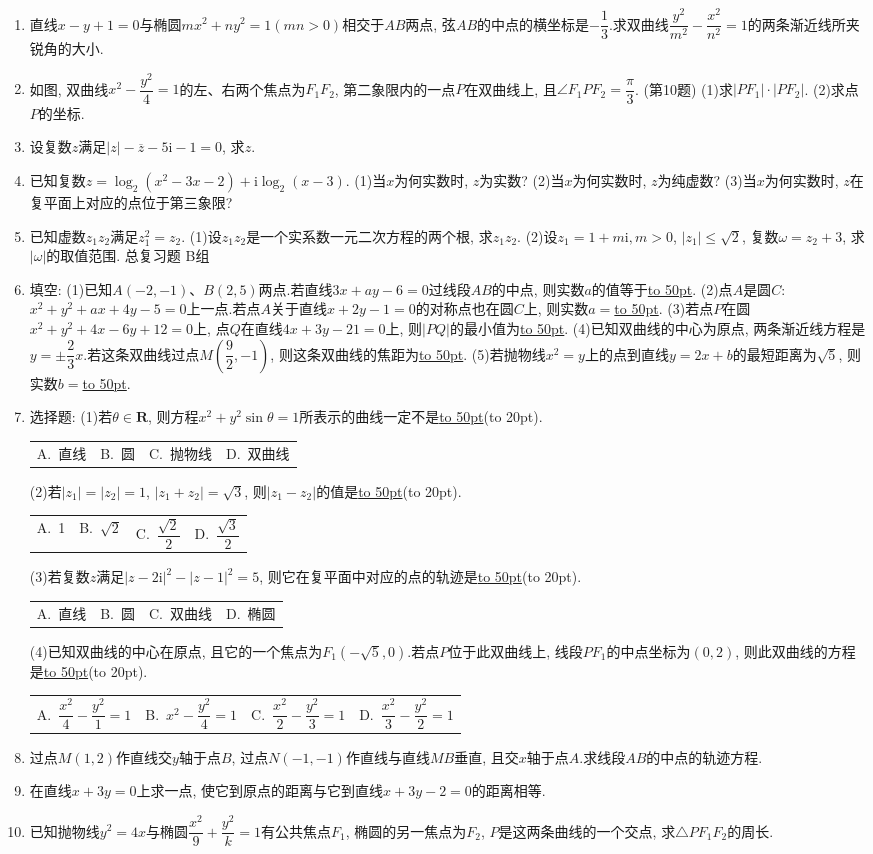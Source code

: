 \documentclass[10pt,a4paper]{article}
\newcommand{\blank}[1]{\underline{\hbox to #1pt{}}}
\newcommand{\bracket}[1]{(\hbox to #1pt{})}
\newcommand{\fourch}[4]{\par\begin{tabular}{p{.23\textwidth}p{.23\textwidth}p{.23\textwidth}p{.23\textwidth}}
A.~#1 &B.~#2& C.~#3& D.~#4
\end{tabular}}
\begin{document}
\begin{enumerate}[1.]
\item 直线$x-y+1=0$与椭圆$mx^2+ny^2=1(mn>0)$相交于$AB$两点, 弦$AB$的中点的横坐标是$-\dfrac 13$.求双曲线$\dfrac{y^2}{m^2}-\dfrac{x^2}{n^2}=1$的两条渐近线所夹锐角的大小.
\item 如图, 双曲线$x^2-\dfrac{y^2}4=1$的左、右两个焦点为$F_1F_2$, 第二象限内的一点$P$在双曲线上, 且$\angle F_1PF_2=\dfrac{\pi }3$.
(第10题)
(1)求$|PF_1|\cdot|PF_2|$.
(2)求点$P$的坐标.
\item 设复数$z$满足$|z|-\overline  z-5\mathrm{i}-1=0$, 求$z$.
\item 已知复数$z=\log _2(x^2-3x-2)+\mathrm{i}\log _2(x-3)$.
(1)当$x$为何实数时, $z$为实数?
(2)当$x$为何实数时, $z$为纯虚数?
(3)当$x$为何实数时, $z$在复平面上对应的点位于第三象限?
\item 已知虚数$z_1z_2$满足$z_1^2=z_2$.
(1)设$z_1z_2$是一个实系数一元二次方程的两个根, 求$z_1z_2$.
(2)设$z_1=1+m\mathrm{i},m>0$, $|z_1|\le \sqrt 2$, 复数$\omega =z_2+3$, 求$|\omega|$的取值范围.
总复习题
B组
\item 填空:
(1)已知$A(-2,-1)$、$B(2,5)$两点.若直线$3x+ay-6=0$过线段$AB$的中点, 则实数$a$的值等于\blank{50}.
(2)点$A$是圆$C$: $x^2+y^2+ax+4y-5=0$上一点.若点$A$关于直线$x+2y-1=0$的对称点也在圆$C$上, 则实数$a=$\blank{50}.
(3)若点$P$在圆$x^2+y^2+4x-6y+12=0$上, 点$Q$在直线$4x+3y-21=0$上, 则$|PQ|$的最小值为\blank{50}.
(4)已知双曲线的中心为原点, 两条渐近线方程是$y=\pm \dfrac 23x$.若这条双曲线过点$M(\dfrac 92,-1)$, 则这条双曲线的焦距为\blank{50}.
(5)若抛物线$x^2=y$上的点到直线$y=2x+b$的最短距离为$\sqrt 5$, 则实数$b=$\blank{50}.
\item 选择题:
(1)若$\theta \in \mathbf{R}$, 则方程$x^2+y^2\sin \theta =1$所表示的曲线一定不是\blank{50}\bracket{20}.
\fourch{直线}{圆}{抛物线}{双曲线}
(2)若$|z_1|=|z_2|=1$, $|z_1+z_2|=\sqrt 3$, 则$|z_1-z_2|$的值是\blank{50}\bracket{20}.
\fourch{1}{$\sqrt 2$}{$\dfrac{\sqrt 2}2$}{$\dfrac{\sqrt 3}2$}
(3)若复数$z$满足$|z-2\mathrm{i}|^2-|z-1|^2=5$, 则它在复平面中对应的点的轨迹是\blank{50}\bracket{20}.
\fourch{直线}{圆}{双曲线}{椭圆}
(4)已知双曲线的中心在原点, 且它的一个焦点为$F_1(-\sqrt 5,0)$.若点$P$位于此双曲线上, 线段$PF_1$的中点坐标为$(0,2)$, 则此双曲线的方程是\blank{50}\bracket{20}.
\fourch{$\dfrac{x^2}4-\dfrac{y^2}1=1$}{$x^2-\dfrac{y^2}4=1$}{$\dfrac{x^2}2-\dfrac{y^2}3=1$}{$\dfrac{x^2}3-\dfrac{y^2}2=1$}
\item 过点$M(1,2)$作直线交$y$轴于点$B$, 过点$N(-1,-1)$作直线与直线$MB$垂直, 且交$x$轴于点$A$.求线段$AB$的中点的轨迹方程.
\item 在直线$x+3y=0$上求一点, 使它到原点的距离与它到直线$x+3y-2=0$的距离相等.
\item 已知抛物线$y^2=4x$与椭圆$\dfrac{x^2}9+\dfrac{y^2}k=1$有公共焦点$F_1$, 椭圆的另一焦点为$F_2$, $P$是这两条曲线的一个交点, 求$\triangle PF_1F_2$的周长.

\end{enumerate}
\end{document}
